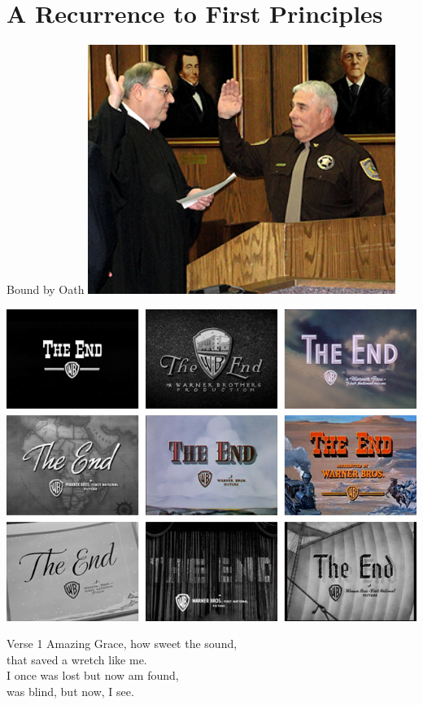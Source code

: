 \section{A Recurrence to First Principles}

\begin{frame}{Bound by Oath}
    \centering
    \includegraphics[width=0.75\textwidth]{img/sheriff-oath.png} \\
\end{frame}

\begin{frame}
   \centering
   \includegraphics[height=.99\textheight]{img/the-end.png} \\
\end{frame}

\begin{frame}{Verse 1}
 \huge{
    \centering
    Amazing Grace, how sweet the sound, \\
    that saved a wretch like me. \\
    I once was lost but now am found, \\
    was blind, but now, I see. \\
}
\end{frame}

